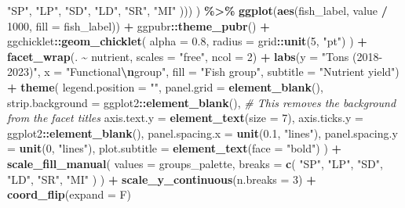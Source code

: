 \documentclass[
]{book}
\newenvironment{Shaded}{\begin{snugshade}}{\end{snugshade}}
\newcommand{\AttributeTok}[1]{\textcolor[rgb]{0.13,0.29,0.53}{#1}}
\newcommand{\CommentTok}[1]{\textcolor[rgb]{0.56,0.35,0.01}{\textit{#1}}}
\newcommand{\DecValTok}[1]{\textcolor[rgb]{0.00,0.00,0.81}{#1}}
\newcommand{\FloatTok}[1]{\textcolor[rgb]{0.00,0.00,0.81}{#1}}
\newcommand{\FunctionTok}[1]{\textcolor[rgb]{0.13,0.29,0.53}{\textbf{#1}}}
\newcommand{\NormalTok}[1]{#1}
\newcommand{\SpecialCharTok}[1]{\textcolor[rgb]{0.81,0.36,0.00}{\textbf{#1}}}
\newcommand{\StringTok}[1]{\textcolor[rgb]{0.31,0.60,0.02}{#1}}
\begin{document}
\begin{Shaded}
\begin{Highlighting}[]
      \StringTok{"SP"}\NormalTok{, }\StringTok{"LP"}\NormalTok{, }\StringTok{"SD"}\NormalTok{, }\StringTok{"LD"}\NormalTok{, }\StringTok{"SR"}\NormalTok{, }\StringTok{"MI"}
\NormalTok{    )))}
\NormalTok{  ) }\SpecialCharTok{\%\textgreater{}\%}
  \FunctionTok{ggplot}\NormalTok{(}\FunctionTok{aes}\NormalTok{(fish\_label, value }\SpecialCharTok{/} \DecValTok{1000}\NormalTok{, }\AttributeTok{fill =}\NormalTok{ fish\_label)) }\SpecialCharTok{+}
\NormalTok{  ggpubr}\SpecialCharTok{::}\FunctionTok{theme\_pubr}\NormalTok{() }\SpecialCharTok{+}
\NormalTok{  ggchicklet}\SpecialCharTok{::}\FunctionTok{geom\_chicklet}\NormalTok{(}
    \AttributeTok{alpha =} \FloatTok{0.8}\NormalTok{,}
    \AttributeTok{radius =}\NormalTok{ grid}\SpecialCharTok{::}\FunctionTok{unit}\NormalTok{(}\DecValTok{5}\NormalTok{, }\StringTok{"pt"}\NormalTok{)}
\NormalTok{  ) }\SpecialCharTok{+}
  \FunctionTok{facet\_wrap}\NormalTok{(. }\SpecialCharTok{\textasciitilde{}}\NormalTok{ nutrient, }\AttributeTok{scales =} \StringTok{"free"}\NormalTok{, }\AttributeTok{ncol =} \DecValTok{2}\NormalTok{) }\SpecialCharTok{+}
  \FunctionTok{labs}\NormalTok{(}\AttributeTok{y =} \StringTok{"Tons (2018{-}2023)"}\NormalTok{, }\AttributeTok{x =} \StringTok{"Functional}\SpecialCharTok{\textbackslash{}n}\StringTok{group"}\NormalTok{, }\AttributeTok{fill =} \StringTok{"Fish group"}\NormalTok{, }\AttributeTok{subtitle =} \StringTok{"Nutrient yield"}\NormalTok{) }\SpecialCharTok{+}
  \FunctionTok{theme}\NormalTok{(}
    \AttributeTok{legend.position =} \StringTok{""}\NormalTok{,}
    \AttributeTok{panel.grid =} \FunctionTok{element\_blank}\NormalTok{(),}
    \AttributeTok{strip.background =}\NormalTok{ ggplot2}\SpecialCharTok{::}\FunctionTok{element\_blank}\NormalTok{(), }\CommentTok{\# This removes the background from the facet titles}
    \AttributeTok{axis.text.y =} \FunctionTok{element\_text}\NormalTok{(}\AttributeTok{size =} \DecValTok{7}\NormalTok{),}
    \AttributeTok{axis.ticks.y =}\NormalTok{ ggplot2}\SpecialCharTok{::}\FunctionTok{element\_blank}\NormalTok{(),}
    \AttributeTok{panel.spacing.x =} \FunctionTok{unit}\NormalTok{(}\FloatTok{0.1}\NormalTok{, }\StringTok{"lines"}\NormalTok{),}
    \AttributeTok{panel.spacing.y =} \FunctionTok{unit}\NormalTok{(}\DecValTok{0}\NormalTok{, }\StringTok{"lines"}\NormalTok{),}
    \AttributeTok{plot.subtitle =} \FunctionTok{element\_text}\NormalTok{(}\AttributeTok{face =} \StringTok{"bold"}\NormalTok{)}
\NormalTok{  ) }\SpecialCharTok{+}
  \FunctionTok{scale\_fill\_manual}\NormalTok{(}
    \AttributeTok{values =}\NormalTok{ groups\_palette,}
    \AttributeTok{breaks =} \FunctionTok{c}\NormalTok{(}
      \StringTok{"SP"}\NormalTok{, }\StringTok{"LP"}\NormalTok{, }\StringTok{"SD"}\NormalTok{, }\StringTok{"LD"}\NormalTok{,}
      \StringTok{"SR"}\NormalTok{, }\StringTok{"MI"}
\NormalTok{    )}
\NormalTok{  ) }\SpecialCharTok{+}
  \FunctionTok{scale\_y\_continuous}\NormalTok{(}\AttributeTok{n.breaks =} \DecValTok{3}\NormalTok{) }\SpecialCharTok{+}
  \FunctionTok{coord\_flip}\NormalTok{(}\AttributeTok{expand =}\NormalTok{ F)}


\end{Highlighting}
\end{Shaded}
\end{document}
